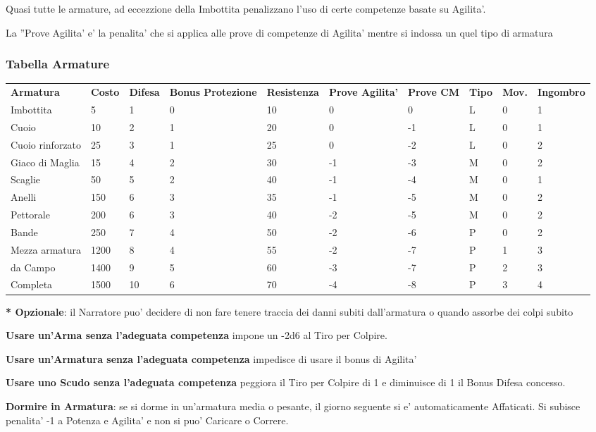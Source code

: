 \documentclass[a4paper,11pt,twoside,openany]{book}
\begin{document}
{Quasi tutte le armature, ad eccezzione della Imbottita penalizzano l'uso di certe competenze basate su Agilita'. 

La ''Prove Agilita' e' la penalita' che si applica alle prove di competenze di Agilita' mentre si indossa un quel tipo di armatura 

\subsubsection{Tabella Armature}
\medskip

\label{tabella-armature}
\begin{tabular}{L{2cm} L{1.2cm} L{1.3cm} L{2cm} L{1.3cm} L{1.5cm} L{1.5cm}L{1cm}L{1cm}L{2cm}} 
\toprule
\textbf{Armatura} &\textbf{Costo} & \textbf{Difesa} & \textbf{Bonus Protezione }& \textbf{Resistenza} & \textbf{Prove Agilita’} & \textbf{Prove CM} & \textbf{Tipo} & \textbf{Mov.} & \textbf{Ingombro}\tabularnewline
Imbottita & 5 & 1 & 0 & 10 & 0 & 0 & L & 0 & 1\tabularnewline
Cuoio & 10 & 2 & 1 & 20 & 0 & -1 & L & 0 & 1\tabularnewline
Cuoio rinforzato & 25 & 3 & 1 & 25 & 0 & -2 & L & 0 & 2\tabularnewline
Giaco di Maglia & 15 & 4 & 2 & 30 & -1 & -3 & M & 0 & 2\tabularnewline
Scaglie & 50 & 5 & 2 & 40 & -1 & -4 & M & 0 & 1\tabularnewline
Anelli & 150 & 6 & 3 & 35 & -1 & -5 & M & 0 & 2\tabularnewline
Pettorale & 200 & 6 & 3 & 40 & -2 & -5 & M & 0 & 2\tabularnewline
Bande & 250 & 7 & 4 & 50 & -2 & -6 & P & 0 & 2\tabularnewline
Mezza armatura & 1200 & 8 & 4 & 55 & -2 & -7 & P & 1 & 3\tabularnewline
da Campo & 1400 & 9 & 5 & 60 & -3 & -7 & P & 2 & 3\tabularnewline
Completa & 1500 & 10 & 6 & 70 & -4 & -8 & P & 3 & 4\tabularnewline
\end{tabular}

\textbf{{*} Opzionale}: il Narratore puo' decidere di non fare tenere traccia dei danni subiti dall'armatura o quando assorbe dei colpi subito

\bigskip

\textbf{Usare un'Arma senza l'adeguata competenza} impone un -2d6 al Tiro per Colpire.

\textbf{Usare un'Armatura senza l'adeguata competenza} impedisce di usare il bonus di Agilita'

\textbf{Usare uno Scudo senza l'adeguata competenza} peggiora il Tiro per Colpire di 1 e diminuisce di 1 il Bonus Difesa concesso.

\textbf{Dormire in Armatura}: se si dorme in un'armatura media o pesante, il giorno seguente si e' automaticamente Affaticati. Si subisce penalita' -1 a Potenza e Agilita' e non si puo' Caricare o Correre.

}
\end{document}
